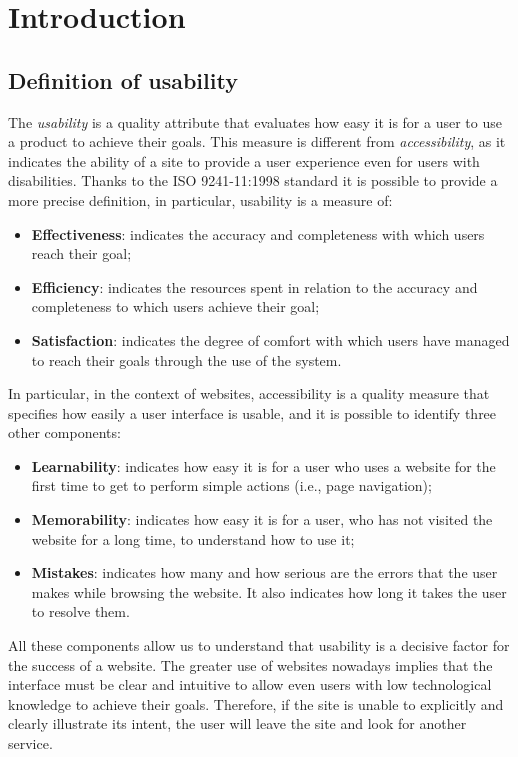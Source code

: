 \section{Introduction}

\subsection{Definition of usability}
The \textit{usability} is a quality attribute that evaluates how easy it is 
for a user to use a product to achieve their goals. This measure is 
different from \textit{accessibility}, as it indicates the ability of a 
site to provide a user experience even for users with disabilities. Thanks 
to the ISO 9241-11:1998 standard it is possible to provide a more precise 
definition, in particular, usability is a measure of:
\begin{itemize}
  \item \textbf{Effectiveness}: indicates the accuracy and completeness 
  with which users reach their goal;

  \item \textbf{Efficiency}: indicates the resources spent in relation to 
  the accuracy and completeness to which users achieve their goal;

  \item \textbf{Satisfaction}: indicates the degree of comfort with which 
  users have managed to reach their goals through the use of the system.
\end{itemize}

In particular, in the context of websites, accessibility is a quality 
measure that specifies how easily a user interface is usable, and it is 
possible to identify three other components:
\begin{itemize}
  \item \textbf{Learnability}: indicates how easy it is for a user who 
  uses a website for the first time to get to perform simple actions 
  (i.e., page navigation);

  \item \textbf{Memorability}: indicates how easy it is for a user, who has 
  not visited the website for a long time, to understand how to use it;

  \item \textbf{Mistakes}: indicates how many and how serious are the 
  errors that the user makes while browsing the website. It also indicates 
  how long it takes the user to resolve them.
\end{itemize}

All these components allow us to understand that usability is a decisive 
factor for the success of a website. The greater use of websites nowadays 
implies that the interface must be clear and intuitive to allow even users 
with low technological knowledge to achieve their goals. Therefore, if the 
site is unable to explicitly and clearly illustrate its intent, the user 
will leave the site and look for another service.